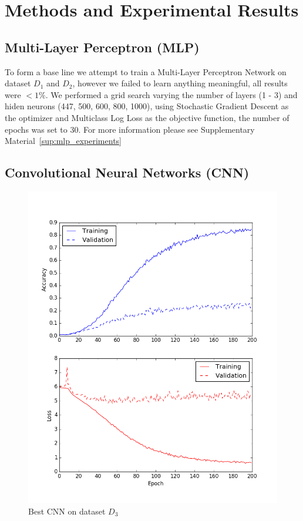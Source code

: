 \newpage
\section{Methods and Experimental Results}
\label{sec:methods_and_experimental_results}


\subsection{Multi-Layer Perceptron (MLP)}
\label{subsec:mlp}
To form a base line we attempt to train a Multi-Layer Perceptron Network on dataset $D_{1}$ and $D_{2}$, however we failed to learn anything meaningful, all results were $< 1\%$. We performed a grid search varying the number of layers (1 - 3) and hiden neurons (447, 500, 600, 800, 1000), using Stochastic Gradient Descent as the optimizer and Multiclass Log Loss as the objective function, the number of epochs was set to 30. For more information please see Supplementary Material~\ref{sup:mlp_experiments}

\subsection{Convolutional Neural Networks (CNN)}
\label{subsec:cnn}

\begin{figure}
	\vspace{-1.3cm}
	\includegraphics[width=\linewidth]{sections/imgs/cnn/cnn_best.png}
	\caption{Best CNN on dataset $D_{3}$}
	\label{fig:cnn_d3}
	\vspace{-1.3cm}
\end{figure}

